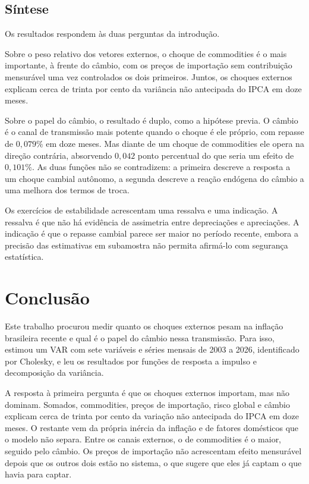\documentclass[12pt,openright,oneside,a4paper,portuguese,brazil]{abntex2}
\begin{document}
\section{Síntese}
\label{sec:sintese}

Os resultados respondem às duas perguntas da introdução.

Sobre o peso relativo dos vetores externos, o choque de commodities é o mais
importante, à frente do câmbio, com os preços de importação sem contribuição
mensurável uma vez controlados os dois primeiros. Juntos, os choques externos
explicam cerca de trinta por cento da variância não antecipada do IPCA em doze
meses.

Sobre o papel do câmbio, o resultado é duplo, como a hipótese previa. O câmbio
é o canal de transmissão mais potente quando o choque é ele próprio, com
repasse de $0{,}079\%$ em doze meses. Mas diante de um choque de commodities
ele opera na direção contrária, absorvendo $0{,}042$ ponto percentual do que
seria um efeito de $0{,}101\%$. As duas funções não se contradizem: a primeira
descreve a resposta a um choque cambial autônomo, a segunda descreve a reação
endógena do câmbio a uma melhora dos termos de troca.

Os exercícios de estabilidade acrescentam uma ressalva e uma indicação. A
ressalva é que não há evidência de assimetria entre depreciações e apreciações.
A indicação é que o repasse cambial parece ser maior no período recente, embora
a precisão das estimativas em subamostra não permita afirmá-lo com segurança
estatística.




\chapter{Conclusão}
\label{cap:conclusao}

Este trabalho procurou medir quanto os choques externos pesam na inflação
brasileira recente e qual é o papel do câmbio nessa transmissão. Para isso,
estimou um VAR com sete variáveis e séries mensais de 2003 a 2026, identificado
por Cholesky, e leu os resultados por funções de resposta a impulso e
decomposição da variância.

A resposta à primeira pergunta é que os choques externos importam, mas não
dominam. Somados, commodities, preços de importação, risco global e câmbio
explicam cerca de trinta por cento da variação não antecipada do IPCA em doze
meses. O restante vem da própria inércia da inflação e de fatores domésticos
que o modelo não separa. Entre os canais externos, o de commodities é o maior,
seguido pelo câmbio. Os preços de importação não acrescentam efeito mensurável
depois que os outros dois estão no sistema, o que sugere que eles já captam o
que havia para captar.
\end{document}
